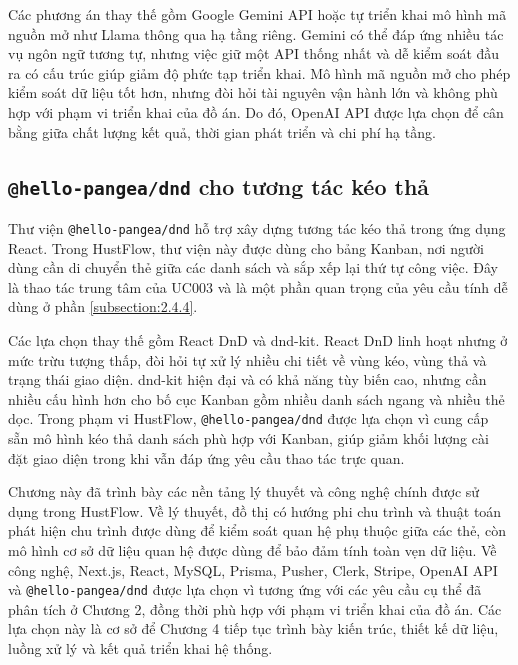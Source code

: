 \documentclass[../DoAn.tex]{subfiles}
\begin{document}
Các phương án thay thế gồm Google Gemini API hoặc tự triển khai mô hình mã nguồn mở như Llama thông qua hạ tầng riêng. Gemini có thể đáp ứng nhiều tác vụ ngôn ngữ tương tự, nhưng việc giữ một API thống nhất và dễ kiểm soát đầu ra có cấu trúc giúp giảm độ phức tạp triển khai. Mô hình mã nguồn mở cho phép kiểm soát dữ liệu tốt hơn, nhưng đòi hỏi tài nguyên vận hành lớn và không phù hợp với phạm vi triển khai của đồ án. Do đó, OpenAI API được lựa chọn để cân bằng giữa chất lượng kết quả, thời gian phát triển và chi phí hạ tầng.

\subsection{\texttt{@hello-pangea/dnd} cho tương tác kéo thả}
\label{subsection:3.2.7}

Thư viện \texttt{@hello-pangea/dnd} \cite{hellopangeadnd} hỗ trợ xây dựng tương tác kéo thả trong ứng dụng React. Trong HustFlow, thư viện này được dùng cho bảng Kanban, nơi người dùng cần di chuyển thẻ giữa các danh sách và sắp xếp lại thứ tự công việc. Đây là thao tác trung tâm của UC003 và là một phần quan trọng của yêu cầu tính dễ dùng ở phần \ref{subsection:2.4.4}.

Các lựa chọn thay thế gồm React DnD và dnd-kit. React DnD linh hoạt nhưng ở mức trừu tượng thấp, đòi hỏi tự xử lý nhiều chi tiết về vùng kéo, vùng thả và trạng thái giao diện. dnd-kit hiện đại và có khả năng tùy biến cao, nhưng cần nhiều cấu hình hơn cho bố cục Kanban gồm nhiều danh sách ngang và nhiều thẻ dọc. Trong phạm vi HustFlow, \texttt{@hello-pangea/dnd} được lựa chọn vì cung cấp sẵn mô hình kéo thả danh sách phù hợp với Kanban, giúp giảm khối lượng cài đặt giao diện trong khi vẫn đáp ứng yêu cầu thao tác trực quan.


Chương này đã trình bày các nền tảng lý thuyết và công nghệ chính được sử dụng trong HustFlow. Về lý thuyết, đồ thị có hướng phi chu trình và thuật toán phát hiện chu trình được dùng để kiểm soát quan hệ phụ thuộc giữa các thẻ, còn mô hình cơ sở dữ liệu quan hệ được dùng để bảo đảm tính toàn vẹn dữ liệu. Về công nghệ, Next.js, React, MySQL, Prisma, Pusher, Clerk, Stripe, OpenAI API và \texttt{@hello-pangea/dnd} được lựa chọn vì tương ứng với các yêu cầu cụ thể đã phân tích ở Chương 2, đồng thời phù hợp với phạm vi triển khai của đồ án. Các lựa chọn này là cơ sở để Chương 4 tiếp tục trình bày kiến trúc, thiết kế dữ liệu, luồng xử lý và kết quả triển khai hệ thống.
\end{document}
